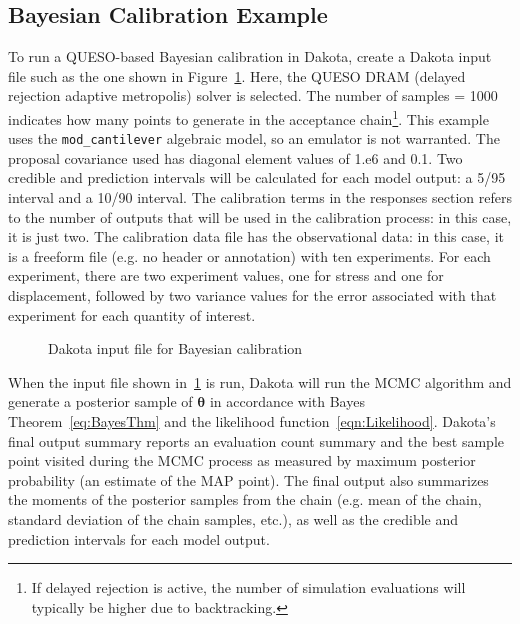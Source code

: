 \subsection{Bayesian Calibration Example}\label{uq:bayesian:ex}

To run a QUESO-based Bayesian calibration in Dakota, create a Dakota
input file such as the one shown in Figure~\ref{uq:figure18}.  Here,
the QUESO DRAM (delayed rejection adaptive metropolis) solver is
selected. The number of samples = 1000 indicates how many points to
generate in the acceptance chain\footnote{If delayed rejection is
  active, the number of simulation evaluations will typically be
  higher due to backtracking.}.  This example uses the
\texttt{mod\_cantilever} algebraic model, so an emulator is not
warranted.  The proposal covariance used has diagonal element values
of 1.e6 and 0.1. Two credible and prediction intervals will be
calculated for each model output: a 5/95 interval and a 10/90
interval. The calibration terms in the responses section refers to the
number of outputs that will be used in the calibration process: in
this case, it is just two. The calibration data file has the
observational data: in this case, it is a freeform file (e.g. no
header or annotation) with ten experiments. For each experiment, there
are two experiment values, one for stress and one for displacement,
followed by two variance values for the error associated with that
experiment for each quantity of interest.

\begin{figure}[htbp!]
  \centering
  \begin{bigbox}
    \begin{small}
    \end{small}
  \end{bigbox}
  \caption{Dakota input file for Bayesian calibration}
\label{uq:figure18}
\end{figure}

When the input file shown in~\ref{uq:figure18} is run, Dakota will run
the MCMC algorithm and generate a posterior sample of
$\boldsymbol{\theta}$ in accordance with Bayes
Theorem~\ref{eq:BayesThm} and the likelihood
function~\ref{eqn:Likelihood}. Dakota's final output summary reports
an evaluation count summary and the best sample point visited during
the MCMC process as measured by maximum posterior probability (an
estimate of the MAP point).  The final output also summarizes the
moments of the posterior samples from the chain (e.g.  mean of the
chain, standard deviation of the chain samples, etc.), as well as the
credible and prediction intervals for each model output.

